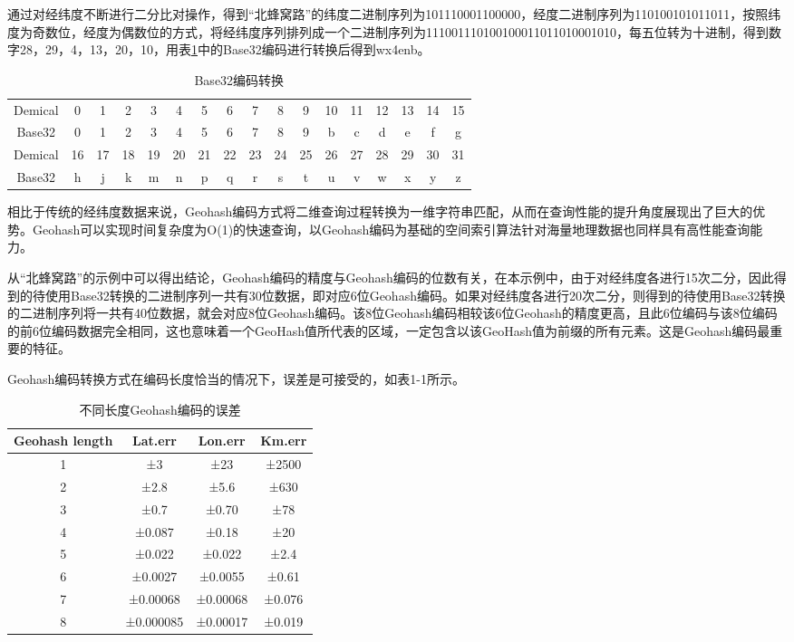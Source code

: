 \fi

通过对经纬度不断进行二分比对操作，得到``北蜂窝路”的纬度二进制序列为101110001100000，经度二进制序列为110100101011011，按照纬度为奇数位，经度为偶数位的方式，将经纬度序列排列成一个二进制序列为111001110100100011011010001010，每五位转为十进制，得到数字28，29，4，13，20，10，用表\ref{base32}中的Base32编码进行转换后得到wx4enb。
\begin{table}[ht]
    \linespread{1.5}
    \centering
    \caption{Base32编码转换}
    \label{base32}
    \begin{tabular}{ccccccccccccccccc}
    \toprule
    Demical & 0 & 1 & 2 & 3 & 4 & 5 & 6 & 7 & 8 & 9 & 10 & 11 & 12 & 13 & 14 & 15 \\
    Base32 & 0 & 1 & 2 & 3 & 4 & 5 & 6 & 7 & 8 & 9 & b & c & d & e & f & g \\
    Demical & 16 & 17 & 18 & 19 & 20 & 21 & 22 & 23 & 24 & 25 & 26 & 27 & 28 & 29 & 30 & 31 \\
    Base32 & h & j & k & m & n & p & q & r & s & t & u & v & w & x & y & z \\
    \bottomrule
    \end{tabular}
\end{table}

相比于传统的经纬度数据来说，Geohash编码方式将二维查询过程转换为一维字符串匹配，从而在查询性能的提升角度展现出了巨大的优势。Geohash可以实现时间复杂度为O(1)的快速查询，以Geohash编码为基础的空间索引算法针对海量地理数据也同样具有高性能查询能力\cite{2014AGeohash}。

从``北蜂窝路”的示例中可以得出结论，Geohash编码的精度与Geohash编码的位数有关，在本示例中，由于对经纬度各进行15次二分，因此得到的待使用Base32转换的二进制序列一共有30位数据，即对应6位Geohash编码。如果对经纬度各进行20次二分，则得到的待使用Base32转换的二进制序列将一共有40位数据，就会对应8位Geohash编码。该8位Geohash编码相较该6位Geohash的精度更高，且此6位编码与该8位编码的前6位编码数据完全相同，这也意味着一个GeoHash值所代表的区域，一定包含以该GeoHash值为前缀的所有元素。这是Geohash编码最重要的特征。

Geohash编码转换方式在编码长度恰当的情况下，误差是可接受的，如表1-1所示。
\begin{table}[ht]
    \linespread{1.5}
    \centering
    \caption{不同长度Geohash编码的误差}
    \label{geo1}
    \begin{tabular}{cccc}
    \toprule
    Geohash length & Lat.err & Lon.err & Km.err \\
    \hline
    1 & ±3 & ±23 & ±2500 \\
    2 & ±2.8 & ±5.6 & ±630 \\
    3 & ±0.7 & ±0.70 & ±78 \\
    4 & ±0.087 & ±0.18 & ±20 \\
    5 & ±0.022 & ±0.022 & ±2.4 \\
    6 & ±0.0027 & ±0.0055 & ±0.61 \\
    7 & ±0.00068 & ±0.00068 & ±0.076 \\
    8 & ±0.000085 & ±0.00017 & ±0.019 \\
    \bottomrule
    \end{tabular}
\end{table}

